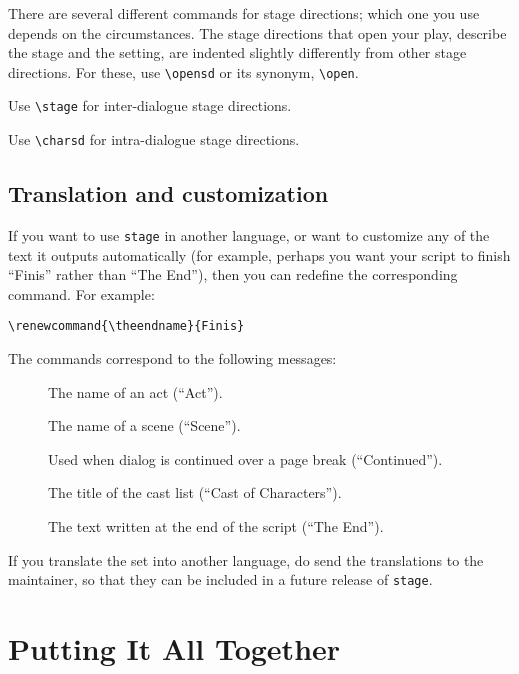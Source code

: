 \documentclass{report}
\begin{document}
There are several different commands for stage directions; which one you use depends on the circumstances. The stage directions that open your play, describe the stage and the setting, are indented slightly differently from other stage directions. For these, use \verb|\opensd| or its synonym, \verb|\open|.

Use \verb|\stage| for inter-dialogue stage directions.

Use \verb|\charsd| for intra-dialogue stage directions.

\section{Translation and customization}

If you want to use \texttt{stage} in another language, or want to customize any of the text it outputs automatically (for example, perhaps you want your script to finish “Finis” rather than “The End”), then you can redefine the corresponding command. For example:

\begin{verbatim}
\renewcommand{\theendname}{Finis}
\end{verbatim}

The commands correspond to the following messages:

\begin{description}
  \item[\Q{\\actname}]The name of an act (“Act”).
  \item[\Q{\\scenename}]The name of a scene (“Scene”).
  \item[\Q{\\continuedname}]Used when dialog is continued over a page break (“Continued”).
  \item[\Q{\\castname}]The title of the cast list (“Cast of Characters”).
  \item[\Q{\\theendname}]The text written at the end of the script (“The End”).
\end{description}

If you translate the set into another language, do send the translations to the maintainer, so that they can be included in a future release of \texttt{stage}.


\chapter{Putting It All Together}
\end{document}
